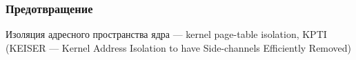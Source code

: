 





\subsubsection{Предотвращение}
\begin{frame}{\insertsubsubsection}

  Изоляция адресного пространства ядра --- kernel page-table isolation, KPTI
  (KEISER --- Kernel Address Isolation to have Side-channels Efficiently
  Removed)


\end{frame}